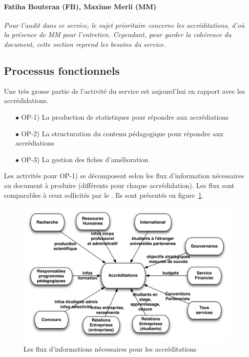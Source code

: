 \documentclass{book}
\begin{document}
\paragraph{Fatiha Bouteraa (FB), Maxime Merli (MM)} 

\textit{Pour l'audit dans ce service, le sujet prioritaire concerne les 
accréditations, d'où la présence de MM pour l'entretien. Cependant, pour 
garder la cohérence du document, cette section reprend les besoins du service.}

\subsection{Processus fonctionnels}

Une très grosse partie de l'activité du service est aujourd'hui en rapport avec les
accrédidations. 
\begin{itemize}
\item[$\bullet$] OP-1) La production de statistiques pour répondre aux accrédiations
\item[$\bullet$] OP-2) La structuration du contenu pédagogique pour répondre aux accrédiations
\item[$\bullet$] OP-3) La gestion  des fiches d'amélioration
\end{itemize}
\bigskip
Les activités pour OP-1) se décomposent selon les flux d'information nécessaires
au document à produire (différents pour chaque accrédidation). Les flux sont
comparables à ceux sollicités par le \scom. Ils sont présentés en figure~\ref{fg:accred_flux}.
\begin{figure}[hbt]
\begin{center}
\includegraphics[width=.75\linewidth]{figs/accred_flux.pdf}
\end{center}
\caption{Les flux d'informations nécessaires pour les accréditations}
\label{fg:accred_flux}
\end{figure}
\end{document}

